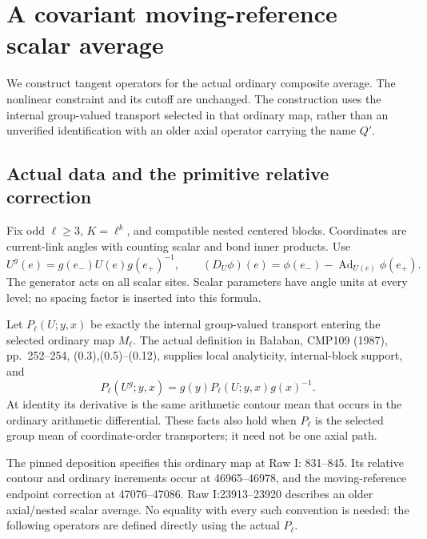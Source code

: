 \section{A covariant moving-reference scalar average}
\label{ccs-section}

We construct tangent operators for the actual ordinary composite
average. The nonlinear constraint and its cutoff are unchanged.
The construction uses the internal group-valued transport selected
in that ordinary map, rather than an unverified identification with
an older axial operator carrying the name \(Q'\).

\subsection{Actual data and the primitive relative correction}
\label{ccs-primitive-section}

Fix odd \(\ell\ge3\), \(K=\ell^k\), and compatible nested centered
blocks. Coordinates are current-link angles with counting scalar
and bond inner products. Use
\[
 U^g(e)=g(e_-)U(e)g(e_+)^{-1},\qquad
 (D_U\phi)(e)=\phi(e_-)-\operatorname{Ad}_{U(e)}\phi(e_+).
\]
The generator acts on all scalar sites. Scalar parameters have
angle units at every level; no spacing factor is inserted into
this formula.

Let \(P_\ell(U;y,x)\) be exactly the internal group-valued transport
entering the selected ordinary map \(M_\ell\). The actual definition
in Ba{\l}aban, CMP109 (1987), pp.~252--254, (0.3),(0.5)--(0.12),
supplies local analyticity, internal-block support, and
\begin{equation}
 P_\ell(U^g;y,x)=g(y)P_\ell(U;y,x)g(x)^{-1}.
 \label{ccs-endpoint}
\end{equation}
At identity its derivative is the same arithmetic contour mean
that occurs in the ordinary arithmetic differential.
These facts also hold when \(P_\ell\) is the selected group mean
of coordinate-order transporters; it need not be one axial path.

The pinned deposition specifies this ordinary map at Raw I:
831--845. Its relative contour and ordinary increments occur at
46965--46978, and the moving-reference endpoint correction at
47076--47086. Raw I:23913--23920 describes an older axial/nested
scalar average. No equality with every such convention is needed:
the following operators are defined directly using the actual
\(P_\ell\).

